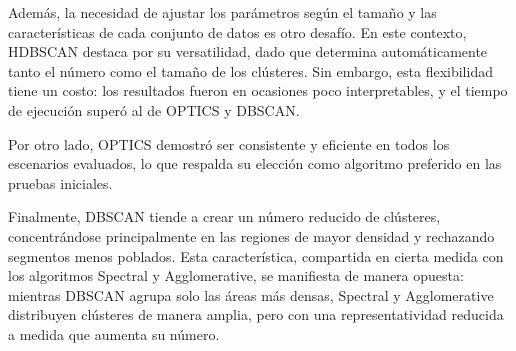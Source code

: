 Además, la necesidad de ajustar los parámetros según el tamaño y las características de cada conjunto de datos es otro desafío. En este contexto, HDBSCAN destaca por su versatilidad, dado que determina automáticamente tanto el número como el tamaño de los clústeres. Sin embargo, esta flexibilidad tiene un costo: los resultados fueron en ocasiones poco interpretables, y el tiempo de ejecución superó al de OPTICS y DBSCAN.

Por otro lado, OPTICS demostró ser consistente y eficiente en todos los escenarios evaluados, lo que respalda su elección como algoritmo preferido en las pruebas iniciales.

Finalmente, DBSCAN tiende a crear un número reducido de clústeres, concentrándose principalmente en las regiones de mayor densidad y rechazando segmentos menos poblados. Esta característica, compartida en cierta medida con los algoritmos Spectral y Agglomerative, se manifiesta de manera opuesta: mientras DBSCAN agrupa solo las áreas más densas, Spectral y Agglomerative distribuyen clústeres de manera amplia, pero con una representatividad reducida a medida que aumenta su número.












